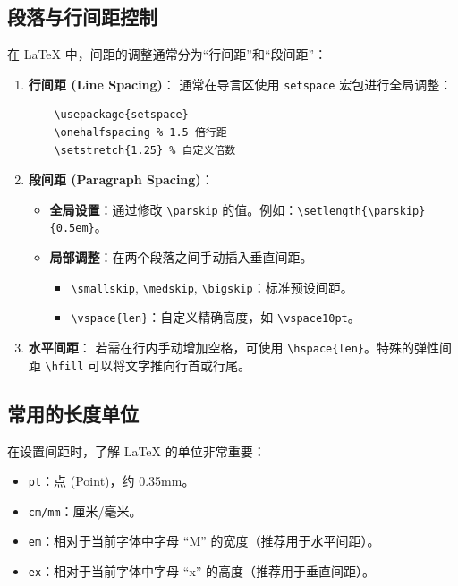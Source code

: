 \subsection{段落与行间距控制}

在 LaTeX 中，间距的调整通常分为“行间距”和“段间距”：

\begin{enumerate}
    \item \textbf{行间距 (Line Spacing)}：
    通常在导言区使用 \texttt{setspace} 宏包进行全局调整：
    \begin{verbatim}
    \usepackage{setspace}
    \onehalfspacing % 1.5 倍行距
    \setstretch{1.25} % 自定义倍数
    \end{verbatim}

    \item \textbf{段间距 (Paragraph Spacing)}：
    \begin{itemize}
        \item \textbf{全局设置}：通过修改 \texttt{\textbackslash parskip} 的值。例如：\texttt{\textbackslash setlength\{\textbackslash parskip\}\{0.5em\}}。
        \item \textbf{局部调整}：在两个段落之间手动插入垂直间距。
        \begin{itemize}
            \item \texttt{\textbackslash smallskip}, \texttt{\textbackslash medskip}, \texttt{\textbackslash bigskip}：标准预设间距。
            \item \texttt{\textbackslash vspace\{len\}}：自定义精确高度，如 \texttt{\textbackslash vspace{10pt}}。
        \end{itemize}
    \end{itemize}

    \item \textbf{水平间距}：
    若需在行内手动增加空格，可使用 \texttt{\textbackslash hspace\{len\}}。特殊的弹性间距 \texttt{\textbackslash hfill} 可以将文字推向行首或行尾。
\end{enumerate}

\subsection{常用的长度单位}
在设置间距时，了解 LaTeX 的单位非常重要：
\begin{itemize}
    \item \texttt{pt}：点 (Point)，约 0.35mm。
    \item \texttt{cm/mm}：厘米/毫米。
    \item \texttt{em}：相对于当前字体中字母 ``M'' 的宽度（推荐用于水平间距）。
    \item \texttt{ex}：相对于当前字体中字母 ``x'' 的高度（推荐用于垂直间距）。
\end{itemize}

